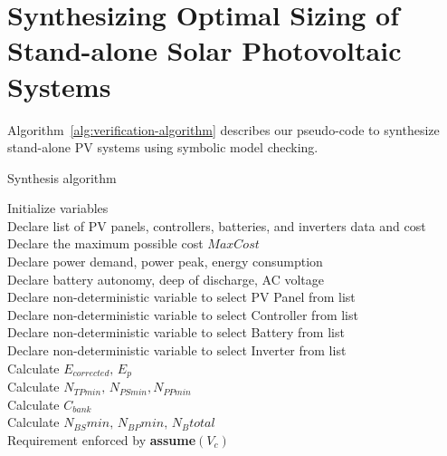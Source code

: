 \documentclass[runningheads]{llncs}
\begin{document}
\section{Synthesizing Optimal Sizing of Stand-alone Solar Photovoltaic Systems}
Algorithm~\ref{alg:verification-algorithm} describes our pseudo-code to synthesize stand-alone PV systems using symbolic model checking. 
%
 \begin{algorithm}
 \caption{Synthesis algorithm}
 \begin{algorithmic}[1]
 \begin{scriptsize}
 \renewcommand{\algorithmicrequire}{\textbf{Input:}}
 \renewcommand{\algorithmicensure}{\textbf{Output:}}
  \STATE Initialize variables \\
  \STATE Declare list of PV panels, controllers, batteries, and inverters data and cost \\
  \STATE Declare the maximum possible cost $MaxCost$  \\
  \STATE Declare power demand, power peak, energy consumption \\
  \STATE Declare battery autonomy, deep of discharge, AC voltage \\
 	\STATE Declare non-deterministic variable to select PV Panel from list \\
 	\STATE Declare non-deterministic variable to select Controller from list \\
 	\STATE Declare non-deterministic variable to select Battery from list \\
 	\STATE Declare non-deterministic variable to select Inverter from list \\ 	
 	\STATE Calculate $E_{corrected}, \, E_{p} $ \\
	\STATE Calculate $N_{TPmin}, \, N_{PSmin}, N_{PPmin} $ \\
 	\STATE Calculate $C_{bank}$ \\
	\STATE Calculate $N_{BS}min, \, N_{BP}min, \, N_{B}total$ \\
	\STATE Requirement enforced by \textbf{assume}$(V_{c})$ \\

\end{scriptsize}
\end{algorithmic}
\end{algorithm}
\end{document}
